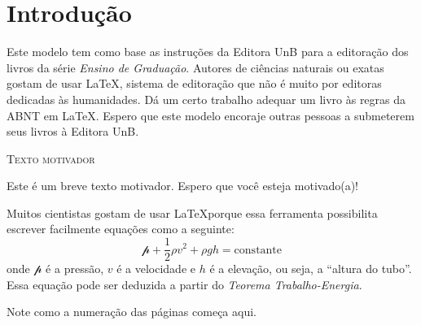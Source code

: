 \chapter{Introdução}

\thispagestyle{empty} 

Este modelo tem como base as instruções da Editora UnB para a editoração dos livros da série \textit{Ensino de Graduação}. Autores de ciências naturais ou exatas gostam de usar \LaTeX, sistema de editoração que não é muito por editoras dedicadas às humanidades. Dá um certo trabalho adequar um livro às regras da ABNT em \LaTeX. Espero que este modelo encoraje outras pessoas a submeterem seus livros à Editora UnB.

\begin{mdframed}[style=noteSty]

{\center \textsc{Texto motivador} \par}

   Este é um breve texto motivador. Espero que você esteja motivado(a)!
   
\end{mdframed}

Muitos cientistas gostam de usar \LaTeX porque essa ferramenta possibilita escrever facilmente equações como a seguinte:
\begin{equation}
 \mathscr{p}+\frac{1}{2}{\rho}v^2+{\rho}gh = \text{constante}
 \label{eq:Bernoulli}
\end{equation}
onde $\mathscr{p}$ é a pressão, $v$ é a velocidade e $h$ é a elevação, ou seja, a “altura do tubo”. Essa equação pode ser deduzida a partir do \textit{Teorema Trabalho-Energia}.   %

\newpage

Note como a numeração das páginas começa aqui.